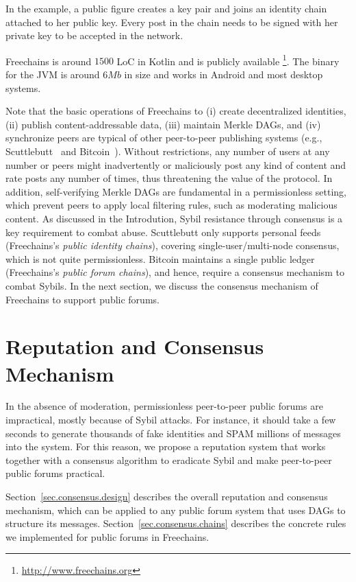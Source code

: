 \documentclass[10pt,journal,compsoc]{IEEEtran}
\newcommand{\FC}       {Freechains\xspace}
\begin{document}
In the example, a public figure creates a key pair and joins an identity chain
attached to her public key.
Every post in the chain needs to be signed with her private key to be accepted
in the network.

\FC is around $1500$ LoC in Kotlin and is publicly available%
\footnote{\url{http://www.freechains.org}}.
The binary for the JVM is around $6Mb$ in size and works in Android and most
desktop systems.

Note that the basic operations of Freechains to (i) create decentralized
identities, (ii) publish content-addressable data, (iii) maintain Merkle DAGs,
and (iv) synchronize peers are typical of other peer-to-peer publishing systems
(e.g., Scuttlebutt~\cite{p2p.scuttlebutt} and Bitcoin~\cite{p2p.bitcoin}).
Without restrictions, any number of users at any number or peers might
inadvertently or maliciously post any kind of content and rate posts any number
of times, thus threatening the value of the protocol.
In addition, self-verifying Merkle DAGs are fundamental in a permissionless
setting, which prevent peers to apply local filtering rules, such as moderating
malicious content.
%
As discussed in the Introdution, Sybil resistance through consensus is a key
requirement to combat abuse.
Scuttlebutt only supports personal feeds (\FC's \emph{public identity chains}),
covering single-user/multi-node consensus, which is not quite permissionless.
Bitcoin maintains a single public ledger (\FC's \emph{public forum chains}),
and hence, require a consensus mechanism to combat Sybils.
%
In the next section, we discuss the consensus mechanism of \FC to support
public forums.

\section{Reputation and Consensus Mechanism}
\label{sec.consensus}

In the absence of moderation, permissionless peer-to-peer public forums are
impractical, mostly because of Sybil attacks.
For instance, it should take a few seconds to generate thousands of fake
identities and SPAM millions of messages into the system.
For this reason, we propose a reputation system that works together with a
consensus algorithm to eradicate Sybil and make peer-to-peer public forums
practical.

Section~\ref{sec.consensus.design} describes the overall reputation and
consensus mechanism, which can be applied to any public forum system that uses
DAGs to structure its messages.
Section~\ref{sec.consensus.chains} describes the concrete rules we implemented
for public forums in \FC.
\end{document}
